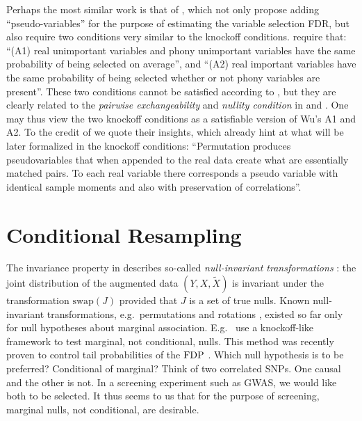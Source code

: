 \documentclass[article,lineno]{biometrika}
\begin{document}
	Perhaps the most similar work is that of \cite{WuControllingVariableSelection2007}, which not only propose adding ``pseudo-variables'' for the purpose of estimating the variable selection \rm{FDR}, but also require two conditions very similar to the knockoff conditions.
	\cite{WuControllingVariableSelection2007} require that:
	``(A1) real unimportant variables and phony unimportant variables have the same probability of being selected on average'', and
	``(A2) real important variables have the same probability of being selected whether or not phony variables are present''.
	These two conditions cannot be satisfied according to \cite{WuControllingVariableSelection2007}, but they are clearly related to the \emph{pairwise exchangeability} and \emph{nullity condition} in \cite{SesiaGenehuntinghidden} and \cite{CandesPanninggoldmodelX2018}.
	One may thus view the two knockoff conditions as a satisfiable version of Wu's A1 and A2.
	To the credit of \cite{WuControllingVariableSelection2007} we quote their insights, which already hint at what will be later formalized in the knockoff conditions:
	``Permutation produces pseudovariables that when appended to the real data create what
	are essentially matched pairs. To each real variable there corresponds a pseudo variable with identical sample moments and also with preservation of correlations''.
	
	
	
	\section{Conditional Resampling}
	The invariance property in \cite{SesiaGenehuntinghidden} describes so-called \emph{null-invariant transformations} \citep{Goeman2010}:
	the joint distribution of the augmented data $(Y,X,\tilde X)$ is invariant under the transformation $\textrm{swap}(J)$ provided that $J$ is a set of true nulls.
	Known null-invariant transformations, e.g.\ permutations and rotations \citep{Langsrud2005}, existed so far only for null hypotheses about marginal association.
	E.g.\ \citet{TusherSignificanceanalysismicroarrays2001} use a knockoff-like framework to test marginal, not conditional, nulls. This method was recently proven to control tail probabilities of the $\rm{FDP}$ \citep{Hemerik2018}.
	Which null hypothesis is to be preferred? Conditional of marginal?
	Think of two correlated SNPs.
	One causal and the other is not.
	In a screening experiment such as GWAS, we would like both to be selected.
	It thus seems to us that for the purpose of screening, marginal nulls, not conditional, are desirable.
	
\end{document}
